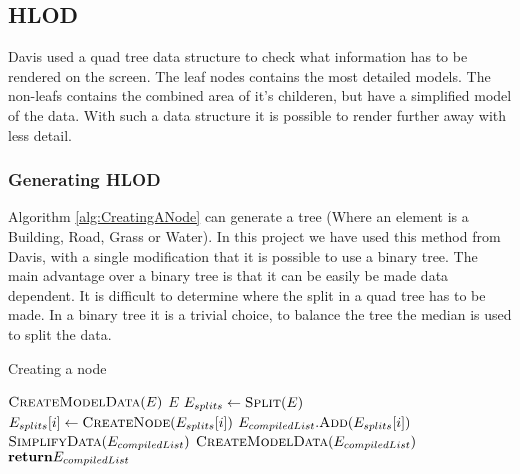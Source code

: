 \subsection{HLOD}
\label{subsec:HLOD}
Davis \cite{Davis} used a quad tree data structure to check what information has to be rendered on the screen. The leaf nodes contains the most detailed models. The non-leafs contains the combined area of it's childeren, but have a simplified model of the data. With such a data structure it is possible to render further away with less detail.

\subsubsection{Generating HLOD}
Algorithm \ref{alg:CreatingANode} can generate a tree (Where an element is a Building, Road, Grass or Water). In this project we have used this method from Davis, with a single modification that it is possible to use a binary tree. The main advantage over a binary tree is that it can be easily be made data dependent. It is difficult to determine where the split in a quad tree has to be made. In a binary tree it is a trivial choice, to balance the tree the median is used to split the data.

\begin{algorithm}
\caption{Creating a node}\label{alg:CreatingANode}
\begin{algorithmic}[1]
    \State $\Call{CreateModelData}{E}$
    \State \Return $E$
\Else
    \State $E_{splits}\gets \Call{Split}{E}$ 
        \State $E_{splits}[i] \gets \Call{CreateNode}{E_{splits}[i]}$
        \State $E_{compiledList}.\Call{Add}{E_{splits}[i]}$
    \EndFor
    \State $\Call{SimplifyData}{E_{compiledList}}$
    \State $\Call{CreateModelData}{E_{compiledList}}$
    \State $\Return E_{compiledList}$
\EndIf
\EndProcedure
\end{algorithmic}
\end{algorithm}

